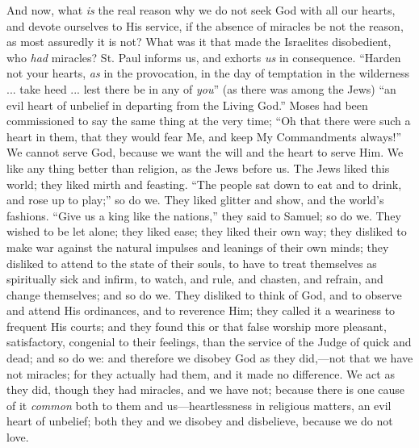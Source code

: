 And now, what \emph{is} the real reason why we do not seek God with
all our hearts, and devote ourselves to His service, if the absence of
miracles be not the reason, as most assuredly it is not? What was it
that made the Israelites disobedient, who \emph{had} miracles? St.
Paul informs us, and exhorts \emph{us} in consequence. ``Harden
not your hearts, \emph{as} in the provocation, in the day of
temptation in the wilderness ... take heed ... lest there be in any of
\emph{you}'' (as there was among the Jews) ``an evil heart of
unbelief in departing from the Living God.'' Moses had been
commissioned to say the same thing at the very time; ``Oh that
there were such a heart in them, that they would fear Me, and keep My
Commandments always!'' We cannot serve God, because we want the
will and the heart to serve Him. We like any thing better than
religion, as the Jews before us. The Jews liked this world; they liked
mirth and feasting. ``The people sat down to eat and to drink, and
rose up to play;'' so do we. They liked glitter and show, and the
world's fashions. ``Give us a king like the nations,'' they
said to Samuel; so do we. They wished to be let alone; they liked
ease; they liked their own way; they disliked to make war against the
natural impulses and leanings of their own minds; they disliked to
attend to the state of their souls, to have to treat themselves as
spiritually sick and infirm, to watch, and rule, and chasten, and
refrain, and change themselves; and so do we. They disliked to think
of God, and to observe and attend His ordinances, and to reverence
Him; they called it a weariness to frequent His courts; and they found
this or that false worship more pleasant, satisfactory, congenial to
their feelings, than the service of the Judge of quick and dead; and
so do we: and therefore we disobey God as they did,—not that we have
not miracles; for they actually had them, and it made no difference.
We act as they did, though they had miracles, and we have not; because
there is one cause of it \emph{common} both to them and us—heartlessness
in religious matters, an evil heart of unbelief; both they and we
disobey and disbelieve, because we do not love.

